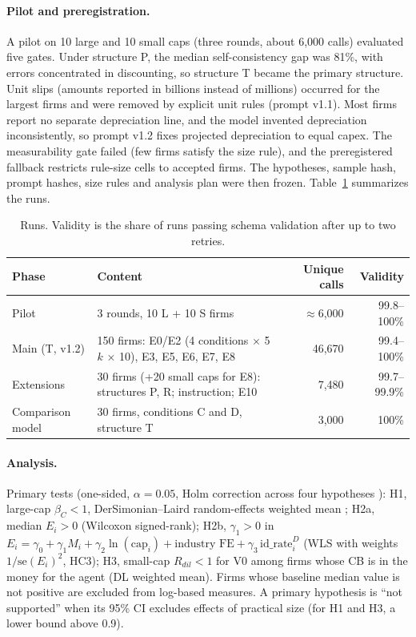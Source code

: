 \documentclass[11pt]{article}
\newcommand{\bC}{\beta_C}
\begin{document}
\paragraph{Pilot and preregistration.} A pilot on 10 large and 10 small caps (three rounds, about 6{,}000 calls) evaluated five gates. Under structure P, the median self-consistency gap was 81\%, with errors concentrated in discounting, so structure T became the primary structure. Unit slips (amounts reported in billions instead of millions) occurred for the largest firms and were removed by explicit unit rules (prompt v1.1). Most firms report no separate depreciation line, and the model invented depreciation inconsistently, so prompt v1.2 fixes projected depreciation to equal capex. The measurability gate failed (few firms satisfy the size rule), and the preregistered fallback restricts rule-size cells to accepted firms. The hypotheses, sample hash, prompt hashes, size rules and analysis plan were then frozen. Table~\ref{tab:runs} summarizes the runs.

\begin{table}[t]
\centering\small
\caption{Runs. Validity is the share of runs passing schema validation after up to two retries.}
\label{tab:runs}
\begin{tabularx}{\linewidth}{lXrr}
\toprule
Phase & Content & Unique calls & Validity \\
\midrule
Pilot & 3 rounds, 10 L + 10 S firms & $\approx$6{,}000 & 99.8--100\% \\
Main (T, v1.2) & 150 firms: E0/E2 (4 conditions $\times$ 5 $k$ $\times$ 10), E3, E5, E6, E7, E8 & 46{,}670 & 99.4--100\% \\
Extensions & 30 firms (+20 small caps for E8): structures P, R; instruction; E10 & 7{,}480 & 99.7--99.9\% \\
Comparison model & 30 firms, conditions C and D, structure T & 3{,}000 & 100\% \\
\bottomrule
\end{tabularx}
\end{table}

\paragraph{Analysis.} Primary tests (one-sided, $\alpha=0.05$, Holm correction across four hypotheses \citep{holm1979simple}): H1, large-cap $\bC<1$, DerSimonian--Laird random-effects weighted mean \citep{dersimonian1986meta}; H2a, median $E_i>0$ (Wilcoxon signed-rank); H2b, $\gamma_1>0$ in $E_i = \gamma_0 + \gamma_1 M_i + \gamma_2 \ln(\text{cap}_i) + \text{industry FE} + \gamma_3\,\text{id\_rate}^D_i$ (WLS with weights $1/\text{se}(E_i)^2$, HC3); H3, small-cap $R_{dil}<1$ for V0 among firms whose CB is in the money for the agent (DL weighted mean). Firms whose baseline median value is not positive are excluded from log-based measures. A primary hypothesis is ``not supported'' when its 95\% CI excludes effects of practical size (for H1 and H3, a lower bound above 0.9).
\end{document}
